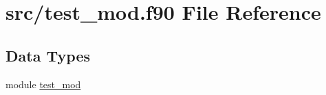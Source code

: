 \hypertarget{test__mod_8f90}{\section{src/test\-\_\-mod.f90 File Reference}
\label{test__mod_8f90}
}
\subsection*{Data Types}
\begin{DoxyCompactItemize}
\item 
module \hyperlink{classtest__mod}{test\-\_\-mod}
\end{DoxyCompactItemize}
